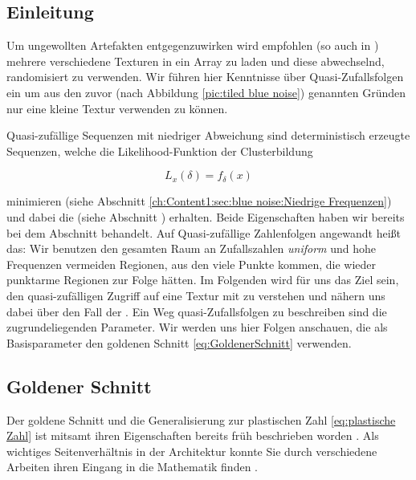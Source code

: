 \subsection{Einleitung}

Um ungewollten Artefakten entgegenzuwirken wird empfohlen (so auch in \cite{bluenoisechrisschied})
mehrere verschiedene  Texturen in ein Array zu laden 
und diese abwechselnd, randomisiert zu verwenden. Wir führen hier Kenntnisse über  
Quasi-Zufallsfolgen ein \cite{quasirandomsequencesbyRoberts} um aus den zuvor (nach Abbildung \ref{pic:tiled blue noise})
genannten Gründen nur eine kleine  Textur verwenden
zu können. \par
Quasi-zufällige Sequenzen mit niedriger Abweichung sind deterministisch 
erzeugte Sequenzen, welche die Likelihood-Funktion der Clusterbildung

\begin{equation}\label{eq:Likeli-Hood-Gleichung}
    L_{x}(\delta) = f_{\delta}(x)
\end{equation}

minimieren (siehe Abschnitt \ref{ch:Content1:sec:blue noise:Niedrige Frequenzen}) und dabei die 
(siehe Abschnitt ) erhalten. Beide Eigenschaften 
haben wir bereits bei dem  Abschnitt behandelt.
Auf Quasi-zufällige Zahlenfolgen angewandt heißt das: Wir benutzen den gesamten Raum an Zufallszahlen
\textit{uniform} und hohe Frequenzen vermeiden Regionen, aus den viele Punkte kommen, die wieder 
punktarme Regionen zur Folge hätten.   
Im Folgenden wird für uns das Ziel sein, den quasi-zufälligen Zugriff auf eine Textur 
mit  zu verstehen und nähern uns dabei über den Fall der 
.
Ein Weg quasi-Zufallsfolgen zu beschreiben sind die zugrundeliegenden Parameter. 
Wir werden uns hier Folgen anschauen, die als Basisparameter den 
goldenen Schnitt \ref{eq:GoldenerSchnitt} verwenden.

\subsection{Goldener Schnitt}

Der goldene Schnitt und die Generalisierung zur plastischen Zahl \ref{eq:plastische Zahl}
ist mitsamt ihren Eigenschaften bereits früh beschrieben worden \cite{vanderlaanplasticnumber}.
Als wichtiges Seitenverhältnis in der Architektur konnte Sie durch verschiedene Arbeiten ihren 
Eingang in die Mathematik finden \cite{krcadinac2006new}.

